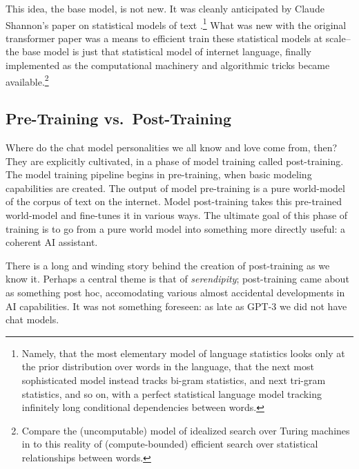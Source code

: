 This idea, the base model, is not new. It was cleanly anticipated by Claude
Shannon's paper on statistical models of text
\cite{shannon1951english}.\footnote{Namely, that the most elementary model of
language statistics looks only at the prior distribution over words in the
language, that the next most sophisticated model instead tracks bi-gram
statistics, and next tri-gram statistics, and so on, with a perfect statistical
language model tracking infinitely long conditional dependencies between
words.} What was new with the original transformer paper was a means to
efficient train these statistical models at scale--the base model is just that
statistical model of internet language, finally implemented as the
computational machinery and algorithmic tricks became
available.\footnote{Compare the (uncomputable) model of idealized search over
Turing machines in \cite{hutter2000aixi} to this reality of (compute-bounded)
efficient search over statistical relationships between words.}

\subsection{Pre-Training vs.\ Post-Training}
Where do the chat model personalities we all know and love come from, then?
They are explicitly cultivated, in a phase of model training called
post-training. The model training pipeline begins in pre-training, when basic
modeling capabilities are created. The output of model pre-training is a pure
world-model of the corpus of text on the internet. Model post-training takes
this pre-trained world-model and fine-tunes it in various ways. The ultimate
goal of this phase of training is to go from a pure world model into something
more directly useful: a coherent AI assistant.

There is a long and winding story behind the creation of post-training as we
know it. Perhaps a central theme is that of \emph{serendipity}; post-training
came about as something post hoc, accomodating various almost accidental
developments in AI capabilities. It was not something foreseen: as late as
GPT-3 we did not have chat models.

